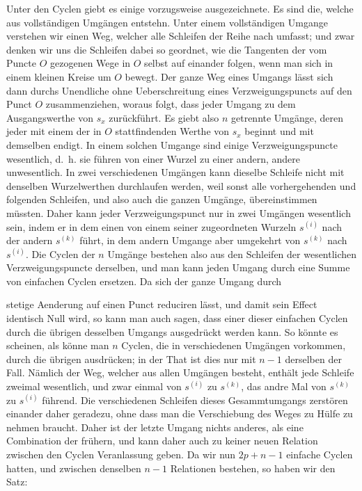 \documentclass[10pt]{article}
\begin{document}
Unter den Cyclen giebt es einige vorzugsweise ausgezeichnete. Es sind die, welche aus vollständigen Umgängen entstehn. Unter einem vollständigen Umgange verstehen wir einen Weg, welcher alle Schleifen der Reihe nach umfasst; und zwar denken wir uns die Schleifen dabei so geordnet, wie die Tangenten der vom Puncte \(O\) gezogenen Wege in \(O\) selbst auf einander folgen, wenn man sich in einem kleinen Kreise um \(O\) bewegt. Der ganze Weg eines Umgangs lässt sich dann durchs Unendliche ohne Ueberschreitung eines Verzweigungspuncts auf den Punct \(O\) zusammenziehen, woraus folgt, dass jeder Umgang zu dem Ausgangswerthe von \(s_x\) zurückführt. Es giebt also \(n\) getrennte Umgänge, deren jeder mit einem der in \(O\) stattfindenden Werthe von \(s_x\) beginnt und mit demselben endigt. In einem solchen Umgange sind einige Verzweigungspuncte wesentlich, d.\ h. sie führen von einer Wurzel zu einer andern, andere unwesentlich. In zwei verschiedenen Umgängen kann dieselbe Schleife nicht mit denselben Wurzelwerthen durchlaufen werden, weil sonst alle vorhergehenden und folgenden Schleifen, und also auch die ganzen Umgänge, übereinstimmen müssten. Daher kann jeder Verzweigungspunct nur in zwei Umgängen wesentlich sein, indem er in dem einen von einem seiner zugeordneten Wurzeln \(s^{(i)}\) nach der andern \(s^{(k)}\) führt, in dem andern Umgange aber umgekehrt von \(s^{(k)}\) nach \(s^{(i)}\). Die Cyclen der \(n\) Umgänge bestehen also aus den Schleifen der wesentlichen Verzweigungspuncte derselben, und man kann jeden Umgang durch eine Summe von einfachen Cyclen ersetzen. Da sich der ganze Umgang durch



stetige Aenderung auf einen Punct reduciren lässt, und damit sein Effect identisch Null wird, so kann man auch sagen, dass einer dieser einfachen Cyclen durch die übrigen desselben Umgangs ausgedrückt werden kann. So könnte es scheinen, als könne man \(n\) Cyclen, die in verschiedenen Umgängen vorkommen, durch die übrigen ausdrücken; in der That ist dies nur mit \(n-1\) derselben der Fall. Nämlich der Weg, welcher aus allen Umgängen besteht, enthält jede Schleife zweimal wesentlich, und zwar einmal von \(s^{(i)}\) zu \(s^{(k)}\), das andre Mal von \(s^{(k)}\) zu \(s^{(i)}\) führend. Die verschiedenen Schleifen dieses Gesammtumgangs zerstören einander daher geradezu, ohne dass man die Verschiebung des Weges zu Hülfe zu nehmen braucht. Daher ist der letzte Umgang nichts anderes, als eine Combination der frühern, und kann daher auch zu keiner neuen Relation zwischen den Cyclen Veranlassung geben. Da wir nun \(2p+n-1\) einfache Cyclen hatten, und zwischen denselben \(n-1\) Relationen bestehen, so haben wir den Satz:
\end{document}
